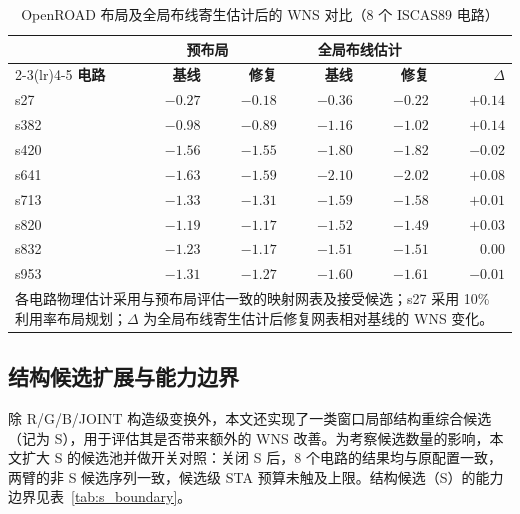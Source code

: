 \documentclass[twocolumn,10pt,fontset=windows]{ctexart}
\begin{document}
\begin{table}[ht]
\centering
\caption{OpenROAD 布局及全局布线寄生估计后的 WNS 对比（8 个 ISCAS89 电路）}
\label{tab:pr8}
\footnotesize
\setlength{\tabcolsep}{2pt}
\begin{tabular}{lrrrrr}
\toprule
 & \multicolumn{2}{c}{\textbf{预布局}} & \multicolumn{2}{c}{\textbf{全局布线估计}} & \\
\cmidrule(lr){2-3}\cmidrule(lr){4-5}
\textbf{电路} & \textbf{基线} & \textbf{修复} & \textbf{基线} & \textbf{修复} & $\Delta$ \\
\midrule
s27  & $-0.27$ & $-0.18$ & $-0.36$ & $-0.22$ & $+0.14$ \\
s382 & $-0.98$ & $-0.89$ & $-1.16$ & $-1.02$ & $+0.14$ \\
s420 & $-1.56$ & $-1.55$ & $-1.80$ & $-1.82$ & $-0.02$ \\
s641 & $-1.63$ & $-1.59$ & $-2.10$ & $-2.02$ & $+0.08$ \\
s713 & $-1.33$ & $-1.31$ & $-1.59$ & $-1.58$ & $+0.01$ \\
s820 & $-1.19$ & $-1.17$ & $-1.52$ & $-1.49$ & $+0.03$ \\
s832 & $-1.23$ & $-1.17$ & $-1.51$ & $-1.51$ & $0.00$ \\
s953 & $-1.31$ & $-1.27$ & $-1.60$ & $-1.61$ & $-0.01$ \\
\bottomrule
\multicolumn{6}{p{0.92\columnwidth}}{\footnotesize 各电路物理估计采用与预布局评估一致的映射网表及接受候选；s27 采用 10\% 利用率布局规划；$\Delta$ 为全局布线寄生估计后修复网表相对基线的 WNS 变化。}\\
\end{tabular}
\end{table}

\subsection{结构候选扩展与能力边界}\label{sec:s_boundary}

除 R/G/B/JOINT 构造级变换外，本文还实现了一类窗口局部结构重综合候选（记为 S），用于评估其是否带来额外的 WNS 改善。为考察候选数量的影响，本文扩大 S 的候选池并做开关对照：关闭 S 后，8 个电路的结果均与原配置一致，两臂的非 S 候选序列一致，候选级 STA 预算未触及上限。结构候选（S）的能力边界见表~\ref{tab:s_boundary}。
\end{document}
